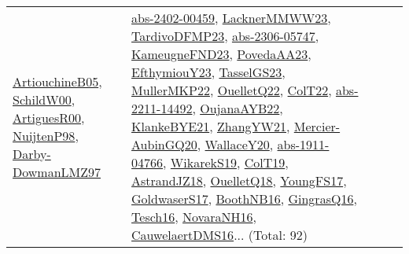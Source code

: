 {\begin{longtable}{lp{3cm}>{\raggedright}p{6cm}>{\raggedright}p{6cm}p{8cm}}
\href{papers/ArtiouchineB05.pdf}{ArtiouchineB05}\cite{ArtiouchineB05}, \href{articles/SchildW00.pdf}{SchildW00}\cite{SchildW00}, \href{articles/ArtiguesR00.pdf}{ArtiguesR00}\cite{ArtiguesR00}, \href{articles/NuijtenP98.pdf}{NuijtenP98}\cite{NuijtenP98}, \href{articles/Darby-DowmanLMZ97.pdf}{Darby-DowmanLMZ97}\cite{Darby-DowmanLMZ97} & \href{articles/abs-2402-00459.pdf}{abs-2402-00459}\cite{abs-2402-00459}, \href{articles/LacknerMMWW23.pdf}{LacknerMMWW23}\cite{LacknerMMWW23}, \href{papers/TardivoDFMP23.pdf}{TardivoDFMP23}\cite{TardivoDFMP23}, \href{articles/abs-2306-05747.pdf}{abs-2306-05747}\cite{abs-2306-05747}, \href{papers/KameugneFND23.pdf}{KameugneFND23}\cite{KameugneFND23}, \href{papers/PovedaAA23.pdf}{PovedaAA23}\cite{PovedaAA23}, \href{papers/EfthymiouY23.pdf}{EfthymiouY23}\cite{EfthymiouY23}, \href{papers/TasselGS23.pdf}{TasselGS23}\cite{TasselGS23}, \href{articles/MullerMKP22.pdf}{MullerMKP22}\cite{MullerMKP22}, \href{papers/OuelletQ22.pdf}{OuelletQ22}\cite{OuelletQ22}, \href{articles/ColT22.pdf}{ColT22}\cite{ColT22}, \href{articles/abs-2211-14492.pdf}{abs-2211-14492}\cite{abs-2211-14492}, \href{papers/OujanaAYB22.pdf}{OujanaAYB22}\cite{OujanaAYB22}, \href{papers/KlankeBYE21.pdf}{KlankeBYE21}\cite{KlankeBYE21}, \href{articles/ZhangYW21.pdf}{ZhangYW21}\cite{ZhangYW21}, \href{papers/Mercier-AubinGQ20.pdf}{Mercier-AubinGQ20}\cite{Mercier-AubinGQ20}, \href{articles/WallaceY20.pdf}{WallaceY20}\cite{WallaceY20}, \href{articles/abs-1911-04766.pdf}{abs-1911-04766}\cite{abs-1911-04766}, \href{articles/WikarekS19.pdf}{WikarekS19}\cite{WikarekS19}, \href{papers/ColT19.pdf}{ColT19}\cite{ColT19}, \href{papers/AstrandJZ18.pdf}{AstrandJZ18}\cite{AstrandJZ18}, \href{papers/OuelletQ18.pdf}{OuelletQ18}\cite{OuelletQ18}, \href{papers/YoungFS17.pdf}{YoungFS17}\cite{YoungFS17}, \href{papers/GoldwaserS17.pdf}{GoldwaserS17}\cite{GoldwaserS17}, \href{papers/BoothNB16.pdf}{BoothNB16}\cite{BoothNB16}, \href{papers/GingrasQ16.pdf}{GingrasQ16}\cite{GingrasQ16}, \href{papers/Tesch16.pdf}{Tesch16}\cite{Tesch16}, \href{articles/NovaraNH16.pdf}{NovaraNH16}\cite{NovaraNH16}, \href{papers/CauwelaertDMS16.pdf}{CauwelaertDMS16}\cite{CauwelaertDMS16}... (Total: 92)\\

\end{longtable}}
